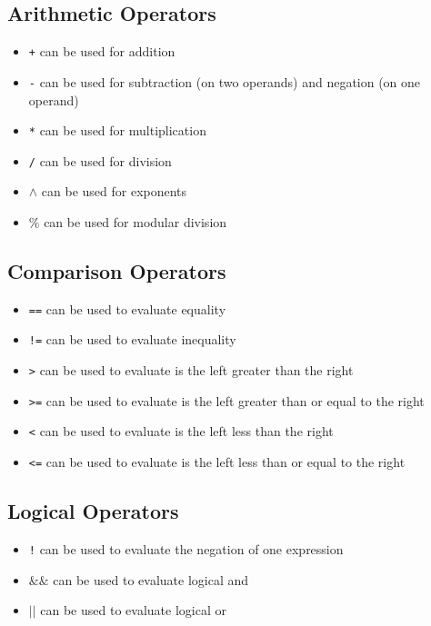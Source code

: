\documentclass{article}
\begin{document}
\subsection{Arithmetic Operators}
\begin{itemize}
\item \texttt{+} can be used for addition
\item \texttt{-} can be used for subtraction (on two operands) and negation (on one operand)
\item \texttt{*} can be used for multiplication
\item \texttt{/} can be used for division
\item \texttt{$\wedge$} can be used for exponents
\item \texttt{$\%$} can be used for modular division
\end{itemize}

\subsection{Comparison Operators}
\begin{itemize}
\item \texttt{==} can be used to evaluate equality
\item \texttt{!=} can be used to evaluate inequality
\item \texttt{>} can be used to evaluate is the left greater than the right
\item \texttt{>=} can be used to evaluate is the left greater than or equal to the right
\item \texttt{<} can be used to evaluate is the left less than the right
\item \texttt{<=} can be used to evaluate is the left less than or equal to the right
\end{itemize}

\subsection{Logical Operators}
\begin{itemize}
\item \texttt{!} can be used to evaluate the negation of one expression
\item \texttt{$\&\&$} can be used to evaluate logical and
\item \texttt{$\vert\vert$} can be used to evaluate logical or
\end{itemize}
\end{document}
